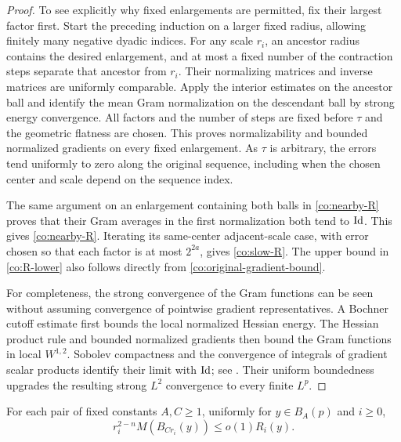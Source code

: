 \begin{proof}
To see explicitly why fixed enlargements are permitted, fix their
largest factor first.  Start the preceding induction on a larger
fixed radius, allowing finitely many negative dyadic indices.
For any scale \(r_i\), an ancestor radius contains the desired
enlargement, and at most a fixed number of the contraction steps
separate that ancestor from \(r_i\).  Their normalizing matrices
and inverse matrices are uniformly comparable.  Apply the
interior estimates on the ancestor ball and identify the mean
Gram normalization on the descendant ball by strong energy
convergence.  All factors and the number of steps are fixed before
\(\tau\) and the geometric flatness are chosen.  This proves
normalizability and bounded normalized gradients on every fixed
enlargement.  As \(\tau\) is arbitrary, the errors tend uniformly
to zero along the original sequence, including when the chosen
center and scale depend on the sequence index.

The same argument on an enlargement containing both balls in
\eqref{co:nearby-R} proves that their Gram averages in the first
normalization both tend to \(\mathrm{Id}\).  This gives
\eqref{co:nearby-R}.  Iterating its same-center adjacent-scale
case, with error chosen so that each factor is at most \(2^{2a}\),
gives \eqref{co:slow-R}.  The upper bound in
\eqref{co:R-lower} also follows directly from
\eqref{co:original-gradient-bound}.

For completeness, the strong convergence of the Gram functions
can be seen without assuming convergence of pointwise gradient
representatives.  A Bochner cutoff estimate first bounds the
local normalized Hessian energy.  The Hessian product rule and
bounded normalized gradients then bound the Gram functions in
local \(W^{1,2}\).  Sobolev compactness and the convergence of
integrals of gradient scalar products identify their limit with
\(\mathrm{Id}\); see \cite[Corollary~4.3 and Theorem~4.6]{AH18}.  Their
uniform boundedness upgrades the resulting strong \(L^2\)
convergence to every finite \(L^p\).
\end{proof}

\begin{lemma}\label{co:bochner-small}
For each pair of fixed constants \(A,C\ge1\), uniformly for \(y\in B_A(p)\) and
\(i\ge0\),
\begin{equation}\label{co:small-mass}
 r_i^{2-n}M(B_{Cr_i}(y))\le o(1)R_i(y).
\end{equation}
\end{lemma}

